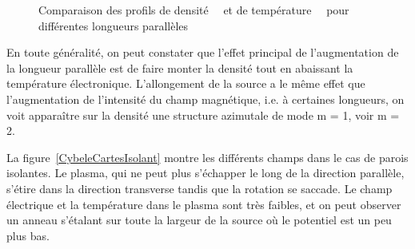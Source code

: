 \begin{refsection}
\begin{figure}[!htbp]
  \centering
    \caption{Comparaison des profils de
    densité~~ et de
    température~~ pour différentes
    longueurs parallèles}
    \label{4-CybeleProfileZ}
\end{figure}

En toute généralité, on peut constater que l'effet
principal de l'augmentation de la longueur parallèle est de faire monter la
densité tout en abaissant la température électronique.
L'allongement de la source a le même effet que l'augmentation de l'intensité du
champ magnétique, i.e. à certaines longueurs, on voit apparaître sur la densité
une structure azimutale de mode m = 1, voir m = 2.

La figure~\ref{CybeleCartesIsolant} montre les différents champs dans le cas de
parois isolantes. Le plasma, qui ne peut plus s'échapper le long de la direction
parallèle, s'étire dans la direction transverse tandis que la rotation se
saccade.
Le champ électrique et la température dans le plasma sont très faibles, et on
peut observer un anneau s'étalant sur toute la largeur de la source où le
potentiel est un peu plus bas.


\end{refsection}
